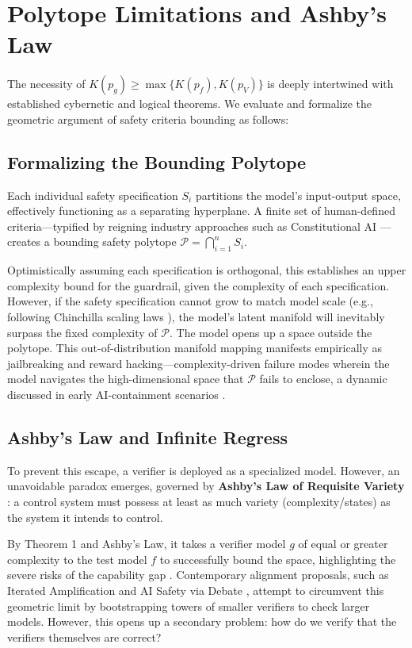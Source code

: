 \documentclass[11pt,twoside,letterpaper]{article}
\begin{document}
\section{Polytope Limitations and Ashby's Law}

The necessity of $K(p_g) \geq \max\{K(p_f), K(p_V)\}$ is deeply intertwined with established cybernetic and logical theorems. We evaluate and formalize the geometric argument of safety criteria bounding as follows:

\subsection{Formalizing the Bounding Polytope}
Each individual safety specification $S_i$ partitions the model's input-output space, effectively functioning as a separating hyperplane. 
A finite set of human-defined criteria—typified by reigning industry approaches such as Constitutional AI \cite{amodei2023constitutional}—creates a bounding safety polytope $\mathcal{P} = \bigcap_{i=1}^{n} S_i$. 

Optimistically assuming each specification is orthogonal, this establishes an upper complexity bound for the guardrail, given the complexity of each specification. However, if the safety specification cannot grow to match model scale (e.g., following Chinchilla scaling laws \cite{hoffmann2022training}), the model's latent manifold will inevitably surpass the fixed complexity of $\mathcal{P}$. The model opens up a space outside the polytope. 
This out-of-distribution manifold mapping manifests empirically as jailbreaking and reward hacking—complexity-driven failure modes wherein the model navigates the high-dimensional space that $\mathcal{P}$ fails to enclose, a dynamic discussed in early AI-containment scenarios \cite{yudkowsky2002ai}.

\subsection{Ashby's Law and Infinite Regress}
To prevent this escape, a verifier is deployed as a specialized model. However, an unavoidable paradox emerges, governed by \textbf{Ashby’s Law of Requisite Variety} \cite{ashby1956}: a control system must possess at least as much variety (complexity/states) as the system it intends to control. 

By Theorem 1 and Ashby's Law, it takes a verifier model $g$ of equal or greater complexity to the test model $f$ to successfully bound the space, highlighting the severe risks of the capability gap \cite{bostrom2014superintelligence}. Contemporary alignment proposals, such as Iterated Amplification \cite{christiano2018amplification} and AI Safety via Debate \cite{irving2018debate}, attempt to circumvent this geometric limit by bootstrapping towers of smaller verifiers to check larger models. However, this opens up a secondary problem: how do we verify that the verifiers themselves are correct? 
\end{document}
